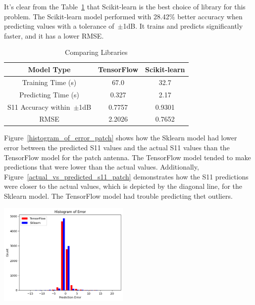 \documentclass[lettersize,journal]{IEEEtran}
\newenvironment{Figure}
    {\par\medskip\noindent\minipage{\linewidth}}
    {\endminipage\par\medskip}
\begin{document}
It's clear from the Table~\ref{comparing_libraries} that Scikit-learn is the best choice of library for this problem. The Scikit-learn model performed with 28.42\% better accuracy when predicting values with a tolerance of~$\pm$1dB. It trains and predicts significantly faster, and it has a lower RMSE.

\begin{table}[h]
\caption{Comparing Libraries}
\begin{center}
\begin{tabular}{ |c|c|c| }
    \hline
    Model Type & TensorFlow & Scikit-learn \\ 
    \hline
    Training Time (s) & 67.0 & 32.7 \\  
    \hline
    Predicting Time (s) & 0.327 & 2.17 \\
    \hline
    S11 Accuracy within~$\pm$1dB & 0.7757 & 0.9301 \\
    \hline
    RMSE & 2.2026 & 0.7652 \\
    \hline
\end{tabular}
\end{center}
\label{comparing_libraries}
\end{table}

Figure~\ref{histogram_of_error_patch} shows how the Sklearn model had lower error between the predicted S11 values and the actual S11 values than the TensorFlow model for the patch antenna. The TensorFlow model tended to make predictions that were lower than the actual values. Additionally, Figure~\ref{actual_vs_predicted_s11_patch} demonstrates how the S11 predictions were closer to the actual values, which is depicted by the diagonal line, for the Sklearn model. The TensorFlow model had trouble predicting thet outliers. 

\begin{Figure}
    \centering
    \includegraphics[width=2.5in]{histogram_patch}
    \label{histogram_of_error_patch}
\end{Figure}
\end{document}
